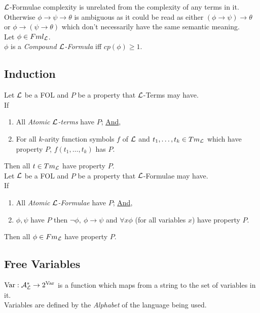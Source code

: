 \documentclass[11pt,a4paper]{article}
\begin{document}
$\mathcal{L}$-Formulae complexity is unrelated from the complexity of any terms in it.\\

Otherwise $\phi\to\psi\to\theta$ is ambiguous as it could be read as either $(\phi\to\psi)\to\theta$ or $\phi\to(\psi\to\theta)$ which don't necessarily have the same semantic meaning.\\

Let $\phi\in Fml_{\mathcal{L}}$.\\
$\phi$ is a \textit{Compound $\mathcal{L}$-Formula} iff $cp(\phi)\geq1$.

\subsection{Induction}

Let $\mathcal{L}$ be a FOL and $P$ be a property that $\mathcal{L}$-Terms may have.\\
If
\begin{enumerate}
	\item All \textit{Atomic $\mathcal{L}$-terms} have $P$; \underline{And},
	\item For all $k$-arity function symbols $f$ of $\mathcal{L}$ and $t_1,\dots,t_k\in Tm_{\mathcal{L}}$ which have property $P$, $f(t_1,\dots,t_k)$ has $P$. %
\end{enumerate}
Then all $t\in Tm_{\mathcal{L}}$ have property $P$.\\

Let $\mathcal{L}$ be a FOL and $P$ be a property that $\mathcal{L}$-Formulae may have.\\
If
\begin{enumerate}
	\item All \textit{Atomic $\mathcal{L}$-Formulae} have $P$; \underline{And},
	\item $\phi,\psi$ have $P$ then $\neg\phi,\ \phi\to\psi$ and $\forall x\phi$ (for all variables $x$) have property $P$.
\end{enumerate}
Then all $\phi\in Fm_{\mathcal{L}}$ have property $P$.

\subsection{Free Variables}

$\mathrm{Var}:\mathcal{A}^*_{\mathcal{L}}\to 2^{\mathrm{Var}}$ is a function which maps from a string to the set of variables in it.\\
Variables are defined by the \textit{Alphabet} of the language being used.\\
\end{document}
